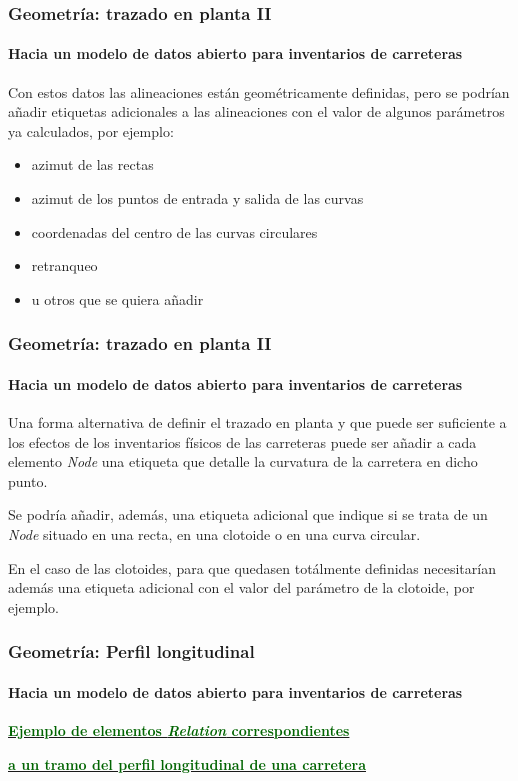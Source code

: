 \documentclass[aspectratio = 169, 12pt]{beamer}
\begin{document}
\begin{frame}
	\frametitle{Geometría: trazado en planta II}
	\framesubtitle{Hacia un modelo de datos abierto para inventarios de carreteras}

	Con estos datos las alineaciones están geométricamente definidas, pero se podrían añadir etiquetas adicionales a las alineaciones con el valor de algunos parámetros ya calculados, por ejemplo:

	\vspace{1.5em}
	\begin{itemize}
		\item azimut de las rectas
		\item azimut de los puntos de entrada y salida de las curvas
		\item coordenadas del centro de las curvas circulares
		\item retranqueo
		\item u otros que se quiera añadir
\end{itemize}

\end{frame}

\begin{frame}
	\frametitle{Geometría: trazado en planta II}
	\framesubtitle{Hacia un modelo de datos abierto para inventarios de carreteras}

	Una forma alternativa de definir el trazado en planta y que puede ser suficiente a los efectos de los inventarios físicos de las carreteras puede ser añadir a cada elemento \textit{Node} una etiqueta que detalle la curvatura de la carretera en dicho punto.

	\vspace{1em}
	Se podría añadir, además, una etiqueta adicional que indique si se trata de un \textit{Node} situado en una recta, en una clotoide o en una curva circular.

	\vspace{1em}En el caso de las clotoides, para que quedasen totálmente definidas necesitarían además una etiqueta adicional con el valor del parámetro de la clotoide, por ejemplo.

\end{frame}



\begin{frame}
	\frametitle{Geometría: Perfil longitudinal}
	\framesubtitle{Hacia un modelo de datos abierto para inventarios de carreteras}

	\begin{center}

		\textbf{\underline{\textcolor{darkgreen}{Ejemplo de elementos \textit{Relation} correspondientes}}}

		\textbf{\underline{\textcolor{darkgreen}{a un tramo del perfil longitudinal de una carretera}}}

	\end{center}


\end{frame}
\end{document}
